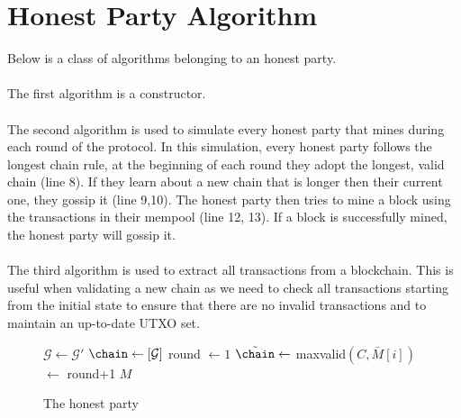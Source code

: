 \section{Honest Party Algorithm}
Below is a class of algorithms belonging to an honest party.
\\
\\
The first algorithm is a constructor.
\\
\\
The second algorithm is used to simulate every honest party that mines during each round of the protocol. In this simulation, every honest party follows the longest chain rule, at the beginning of each round they adopt the longest, valid chain (line 8). If they learn about a new chain that is longer then their current one, they gossip it (line 9,10). The honest party then tries to mine a block using the transactions in their mempool (line 12, 13). If a block is successfully mined, the honest party will gossip it.
\\
\\
The third algorithm is used to extract all transactions from a blockchain. This is useful when validating a new chain as we need to check all transactions starting from the initial state to ensure that there are no invalid transactions and to maintain an up-to-date UTXO set.
\begin{figure}[H]
\begin{algorithm}[H]
    \caption{\label{alg.backbone} The honest party}
    \begin{algorithmic}[1]
     \Statex
     \Let{\chain}{[\,]}
            \State $\mathcal{G} \leftarrow \mathcal{G}'$ 
            \State $\chain \leftarrow [\mathcal{G}]$ 
            \State \textsf{round} $\leftarrow 1$
        \EndFunction
            \State $\tilde\chain \leftarrow$ maxvalid$(C, \bar M[i])$ 
            \If{$\tilde\chain \neq \chain$}
                \Let{\chain}{\tilde\chain}
            \EndIf
             
             
                 
            \EndIf
             $\leftarrow$ {\textsf{round}+1}
            \State\Return$M$
        \EndFunction
             
                 
            \EndFor
            \State{}
        \EndFunction
        \vskip8pt
    \end{algorithmic}
\end{algorithm}
\end{figure}

